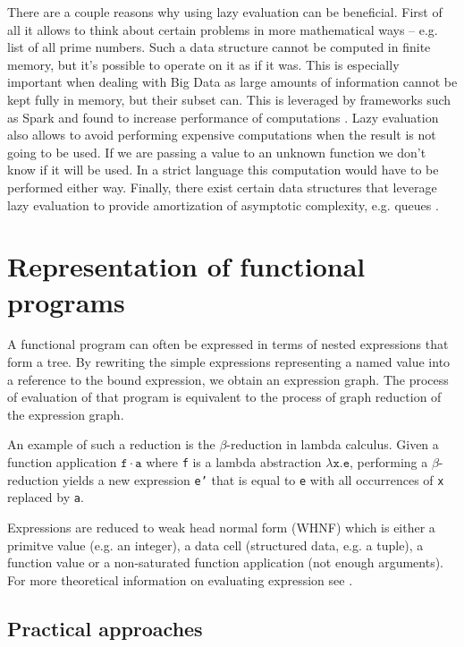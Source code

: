 \documentclass[en]{pracamgr}
\begin{document}
There are a couple reasons why using lazy evaluation can be beneficial.
First of all it allows to think about certain problems in more mathematical
ways -- e.g. list of all prime numbers. Such a data structure cannot
be computed in finite memory, but it's possible to operate on it as if it
was. This is especially important when dealing with Big Data as large
amounts of information cannot be kept fully in memory, but their subset can.
This is leveraged by frameworks such as Spark and found to increase performance
of computations \cite{lazySpark}. Lazy evaluation also allows to avoid
performing expensive computations when the result is not going to be used.
If we are passing a value to an unknown function we don't know if it 
will be used. In a strict language this computation would have to
be performed either way. Finally, there exist certain data structures that
leverage lazy evaluation to provide amortization of asymptotic complexity,
e.g. queues \cite{amortized}.

\section{Representation of functional programs}

A functional program can often be expressed in terms of
nested expressions that form a tree. By rewriting the
simple expressions representing a named value into a
reference to the bound expression, we obtain an expression
graph. The process of evaluation of that program is
equivalent to the process of graph reduction of the expression graph.

An example of such a reduction is the $\beta$-reduction in lambda calculus.
Given a function application $\mathtt{f\cdot a}$ where
\texttt{f} is a lambda abstraction $\mathtt{\lambda x. e}$,
performing a $\beta$-reduction yields a new expression
\texttt{e'} that is equal to \texttt{e} with all
occurrences of \texttt{x} replaced by \texttt{a}.

Expressions are reduced to weak head normal form (WHNF)
which is either a primitve value (e.g. an integer),
a data cell (structured data, e.g. a tuple), a function
value or a non-saturated function application (not enough arguments).
For more theoretical information on evaluating expression see \cite{spj-book}.

\subsection{Practical approaches}
\end{document}
